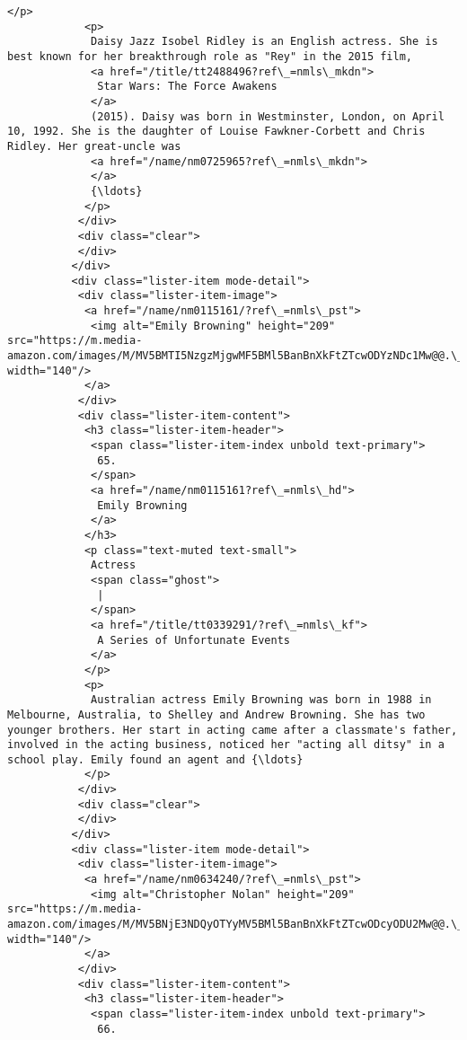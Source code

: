\documentclass[11pt]{article}
\begin{document}
\begin{Verbatim}[commandchars=\\\{\}]
            </p>
            <p>
             Daisy Jazz Isobel Ridley is an English actress. She is best known for her breakthrough role as "Rey" in the 2015 film,
             <a href="/title/tt2488496?ref\_=nmls\_mkdn">
              Star Wars: The Force Awakens
             </a>
             (2015). Daisy was born in Westminster, London, on April 10, 1992. She is the daughter of Louise Fawkner-Corbett and Chris Ridley. Her great-uncle was
             <a href="/name/nm0725965?ref\_=nmls\_mkdn">
             </a>
             {\ldots}
            </p>
           </div>
           <div class="clear">
           </div>
          </div>
          <div class="lister-item mode-detail">
           <div class="lister-item-image">
            <a href="/name/nm0115161/?ref\_=nmls\_pst">
             <img alt="Emily Browning" height="209" src="https://m.media-amazon.com/images/M/MV5BMTI5NzgzMjgwMF5BMl5BanBnXkFtZTcwODYzNDc1Mw@@.\_V1\_UY209\_CR14,0,140,209\_AL\_.jpg" width="140"/>
            </a>
           </div>
           <div class="lister-item-content">
            <h3 class="lister-item-header">
             <span class="lister-item-index unbold text-primary">
              65.
             </span>
             <a href="/name/nm0115161?ref\_=nmls\_hd">
              Emily Browning
             </a>
            </h3>
            <p class="text-muted text-small">
             Actress
             <span class="ghost">
              |
             </span>
             <a href="/title/tt0339291/?ref\_=nmls\_kf">
              A Series of Unfortunate Events
             </a>
            </p>
            <p>
             Australian actress Emily Browning was born in 1988 in Melbourne, Australia, to Shelley and Andrew Browning. She has two younger brothers. Her start in acting came after a classmate's father, involved in the acting business, noticed her "acting all ditsy" in a school play. Emily found an agent and {\ldots}
            </p>
           </div>
           <div class="clear">
           </div>
          </div>
          <div class="lister-item mode-detail">
           <div class="lister-item-image">
            <a href="/name/nm0634240/?ref\_=nmls\_pst">
             <img alt="Christopher Nolan" height="209" src="https://m.media-amazon.com/images/M/MV5BNjE3NDQyOTYyMV5BMl5BanBnXkFtZTcwODcyODU2Mw@@.\_V1\_UY209\_CR5,0,140,209\_AL\_.jpg" width="140"/>
            </a>
           </div>
           <div class="lister-item-content">
            <h3 class="lister-item-header">
             <span class="lister-item-index unbold text-primary">
              66.

\end{Verbatim}
\end{document}
